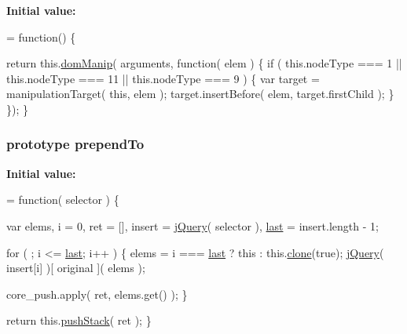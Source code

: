 {\bfseries Initial value\-:}
\begin{DoxyCode}
= \textcolor{keyword}{function}() \{


        \textcolor{keywordflow}{return} this.\hyperlink{jquery-1_810_82-vsdoc_8js_a00a63bd312ef048290dc1755ccb8bae4}{domManip}( arguments, \textcolor{keyword}{function}( elem ) \{
            \textcolor{keywordflow}{if} ( this.nodeType === 1 || this.nodeType === 11 || this.nodeType === 9 ) \{
                var target = manipulationTarget( \textcolor{keyword}{this}, elem );
                target.insertBefore( elem, target.firstChild );
            \}
        \});
    \}
\end{DoxyCode}
\hypertarget{jquery-1_810_82-vsdoc_8js_a404bd77bf3be52acce1d4892d05c2c83}{
\subsubsection[{prepend\-To}]{ {\bf prototype} prepend\-To}}\label{jquery-1_810_82-vsdoc_8js_a404bd77bf3be52acce1d4892d05c2c83}
{\bfseries Initial value\-:}
\begin{DoxyCode}
= \textcolor{keyword}{function}( selector ) \{


        var elems,
            i = 0,
            ret = [],
            insert = \hyperlink{jquery-1_810_82-vsdoc_8js_add5237586d970a38a81f990e8eb28c6c}{jQuery}( selector ),
            \hyperlink{jquery-1_810_82-vsdoc_8js_a5a9684d230de11a6ec3029bcce128977}{last} = insert.length - 1;

        \textcolor{keywordflow}{for} ( ; i <= \hyperlink{jquery-1_810_82-vsdoc_8js_a5a9684d230de11a6ec3029bcce128977}{last}; i++ ) \{
            elems = i === \hyperlink{jquery-1_810_82-vsdoc_8js_a5a9684d230de11a6ec3029bcce128977}{last} ? \textcolor{keyword}{this} : this.\hyperlink{jquery-1_810_82-vsdoc_8js_a7d74ce76585989b4b6e2d506577e13ad}{clone}(\textcolor{keyword}{true});
            \hyperlink{jquery-1_810_82-vsdoc_8js_add5237586d970a38a81f990e8eb28c6c}{jQuery}( insert[i] )[ original ]( elems );

            
            core\_push.apply( ret, elems.get() );
        \}

        \textcolor{keywordflow}{return} this.\hyperlink{jquery-1_810_82-vsdoc_8js_afc3a7db1ef2b526338c06c07cecccd44}{pushStack}( ret );
    \}
\end{DoxyCode}
